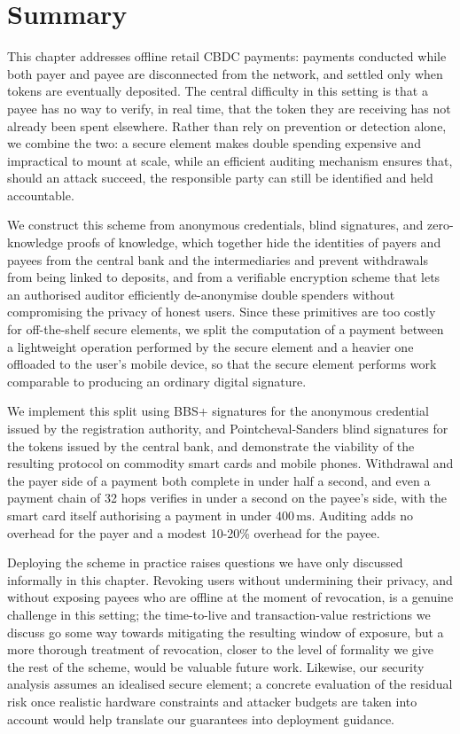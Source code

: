 \section{Summary}\label{sec:offline-summary}

This chapter addresses offline retail CBDC payments: payments conducted
while both payer and payee are disconnected from the network, and settled
only when tokens are eventually deposited. The central difficulty in this
setting is that a payee has no way to verify, in real time, that the token
they are receiving has not already been spent elsewhere. Rather than rely on
prevention or detection alone, we combine the two: a secure element makes
double spending expensive and impractical to mount at scale, while an
efficient auditing mechanism ensures that, should an attack succeed, the
responsible party can still be identified and held accountable.

We construct this scheme from anonymous credentials, blind signatures, and
zero-knowledge proofs of knowledge, which together hide the identities of
payers and payees from the central bank and the intermediaries and prevent
withdrawals from being linked to deposits, and from a verifiable encryption
scheme that lets an authorised auditor efficiently de-anonymise double
spenders without compromising the privacy of honest users. Since these
primitives are too costly for off-the-shelf secure elements, we split the
computation of a payment between a lightweight operation performed by the
secure element and a heavier one offloaded to the user's mobile device, so
that the secure element performs work comparable to producing an ordinary
digital signature.

We implement this split using BBS+ signatures for the anonymous credential
issued by the registration authority, and Pointcheval-Sanders blind
signatures for the tokens issued by the central bank, and demonstrate the
viability of the resulting protocol on commodity smart cards and mobile
phones. Withdrawal and the payer side of a payment both complete in under
half a second, and even a payment chain of 32 hops verifies in under a
second on the payee's side, with the smart card itself authorising a
payment in under $400\,\mathrm{ms}$. Auditing adds no overhead for the
payer and a modest 10-20\% overhead for the payee.

Deploying the scheme in practice raises questions we have only discussed
informally in this chapter. Revoking users without undermining their
privacy, and without exposing payees who are offline at the moment of
revocation, is a genuine challenge in this setting; the time-to-live and
transaction-value restrictions we discuss go some way towards mitigating
the resulting window of exposure, but a more thorough treatment of
revocation, closer to the level of formality we give the rest of the
scheme, would be valuable future work. Likewise, our security analysis
assumes an idealised secure element; a concrete evaluation of the residual
risk once realistic hardware constraints and attacker budgets are taken
into account would help translate our guarantees into deployment guidance.

